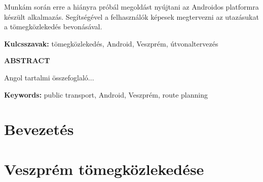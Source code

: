 \documentclass[a4paper,oneside,10pt]{report}
\begin{document}
Munkám során erre a hiányra próbál megoldást nyújtani az Androidos platformra készült alkalmazás.
Segítségével a felhasználók képesek megtervezni az utazásukat a tömegközlekedés bevonásával.

\textbf{Kulcsszavak:} tömegközlekedés, Android, Veszprém, útvonaltervezés

\newpage

\Large
\begin{center}
	\textbf{ABSTRACT}
\end{center}
\normalsize
\noindent
Angol tartalmi összefoglaló...

\textbf{Keywords:} public transport, Android, Veszprém, route planning
\tableofcontents
\newpage
\listoffigures
\newpage






\pagestyle{plain} %







\chapter{Bevezetés}
\label{bev}


\chapter{Veszprém tömegközlekedése}
\label{tom}

\end{document}

